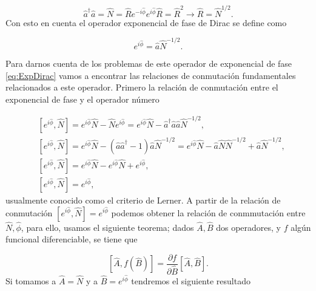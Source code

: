         \begin{equation}
            \hat{a}^\dagger\hat{a} = \hat{N} = \hat{R} e^{-i\hat{\phi}}e^{i\hat{\phi}}\hat{R} = \hat{R}^2 \rightarrow \hat{R} = \hat{N}^{1/2}.
        \end{equation}
        Con esto en cuenta el operador exponencial de fase de Dirac se define como 

        \begin{equation}\label{eq:ExpDirac}
            e^{i\hat{\phi}} = \hat{a}\hat{N}^{-1/2}.
        \end{equation}

        Para darnos cuenta de los problemas de este operador de exponencial de fase \ref{eq:ExpDirac} vamos a encontrar las relaciones de conmutación fundamentales relacionados a este operador. Primero la relación de conmutación entre el exponencial de fase y el operador número

        \begin{align}
            & \left[ e^{i\hat{\phi}}, \hat{N} \right] = e^{i\hat{\phi}}\hat{N} - \hat{N}e^{i\hat{\phi}} = e^{i\hat{\phi}}\hat{N} - \hat{a}^\dagger\hat{a} \hat{a} \hat{N}^{-1/2},\\
            & \left[ e^{i\hat{\phi}}, \hat{N} \right] = e^{i\hat{\phi}}\hat{N} - \left( \hat{a}\hat{a}^\dagger -1 \right)\hat{a}\hat{N}^{-1/2} = e^{i\hat{\phi}}\hat{N}- \hat{a}\hat{N}\hat{N}^{-1/2} + \hat{a}\hat{N}^{-1/2},\\
            & \left[ e^{i\hat{\phi}}, \hat{N} \right] = e^{i\hat{\phi}}\hat{N} - e^{i\hat{\phi}}\hat{N} + e^{i\hat{\phi}},\\
            & \left[ e^{i\hat{\phi}}, \hat{N} \right] = e^{i\hat{\phi}},
        \end{align}
        usualmente conocido como el criterio de Lerner. A partir de la relación de conmutación  $\left[ e^{i\hat{\phi}}, \hat{N} \right] = e^{i\hat{\phi}}$ podemos obtener la relación de conmmutación entre $\hat{N},\hat{\phi}$, para ello, usamos el siguiente teorema; dados $\hat{A},\hat{B}$ dos operadores, y $f$ algún funcional diferenciable, se tiene que

        \begin{equation}
            \left[\hat{A},f\left( \hat{B} \right)\right] = \frac{\partial f}{\partial \hat{B}} [\hat{A},\hat{B}].
        \end{equation}
        Si tomamos a $\hat{A}=\hat{N}$ y a $\hat{B}=e^{i\hat{\phi}}$ tendremos el siguiente resultado

